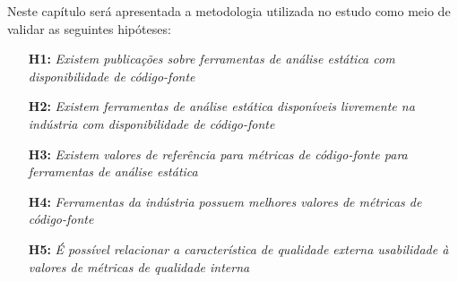 \documentclass[12pt]{article}
\begin{document}
%
%

Neste capítulo será apresentada a metodologia utilizada no estudo como meio
de validar as seguintes hipóteses:

\begin{enumerate}
  \item[{\bf H1:}] {\em Existem publicações sobre ferramentas de análise
    estática com disponibilidade de código-fonte}
  \item[{\bf H2:}] {\em Existem ferramentas de análise estática disponíveis
    livremente na indústria com disponibilidade de código-fonte}
  \item[{\bf H3:}] {\em Existem valores de referência para métricas de
    código-fonte para ferramentas de análise estática}
  \item[{\bf H4:}] {\em Ferramentas da indústria possuem melhores valores de
    métricas de código-fonte}
  \item[{\bf H5:}] {\em É possível relacionar a característica de qualidade
    externa usabilidade à valores de métricas de qualidade interna}
\end{enumerate}
\end{document}
